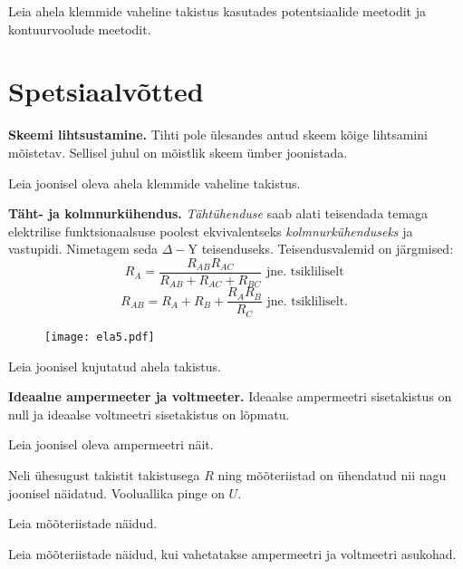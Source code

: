 \documentclass[a4paper,11pt,twocolumn]{article}
\begin{document}
\begin{question}[ela2][5.1cm]
	Leia ahela klemmide vaheline takistus kasutades potentsiaalide meetodit ja kontuurvoolude meetodit.
\end{question}

\section{Spetsiaalvõtted}
\textbf{Skeemi lihtsustamine.} Tihti pole ülesandes antud skeem kõige lihtsamini mõistetav. Sellisel juhul on mõistlik skeem ümber joonistada.
\begin{question}[IPhO 1996, T1][ela1][6.8cm]
	Leia joonisel oleva ahela klemmide vaheline takistus.
\end{question}

\textbf{Täht- ja kolmnurkühendus.} \textit{Tähtühenduse} saab alati teisendada temaga elektrilise funktsionaalsuse poolest ekvivalentseks \textit{kolmnurkühenduseks} ja vastupidi. Nimetagem seda \( \Delta- \)Y teisenduseks. Teisendusvalemid on järgmised:
\[ R _ { A } = \frac { R _ { A B } R _ { A C } } { R _ { A B } + R _ { A C } + R _ { B C } } \textrm{ jne. tsikliliselt } \]
\[ R _ { A B } = R _ { A } + R _ { B } + \frac { R _ { A } R _ { B } } { R _ { C } } \textrm{ jne. tsikliliselt. } \]

\begin{figure}[h]
	\texttt{[image: ela5.pdf]}
	\centering
\end{figure}
\begin{question}[ela6][6cm]
	Leia joonisel kujutatud ahela takistus.
\end{question}

\textbf{Ideaalne ampermeeter ja voltmeeter.} Ideaalse ampermeetri sisetakistus on null ja ideaalse voltmeetri sisetakistus on lõpmatu.
\begin{question}[ela3][4.5 cm]
	Leia joonisel oleva ampermeetri näit.
\end{question}
\begin{question}[Lahtine 2015, N5][ela8][4.6 cm]
	Neli ühesugust takistit takistusega \( R \)	ning mõõteriistad on ühendatud nii nagu joonisel näidatud. Vooluallika
	pinge on \( U \).
	\begin{subquestion}
		\item Leia mõõteriistade näidud.
		\item Leia mõõteriistade näidud, kui vahetatakse ampermeetri ja voltmeetri asukohad.
	\end{subquestion}
\end{question}
\end{document}
